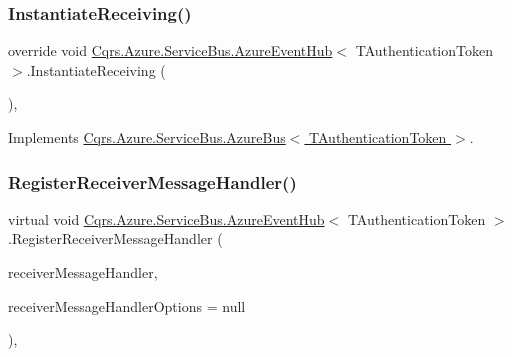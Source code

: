 \subsubsection{\texorpdfstring{Instantiate\+Receiving()}{InstantiateReceiving()}}
{\footnotesize\ttfamily override void \hyperlink{classCqrs_1_1Azure_1_1ServiceBus_1_1AzureEventHub}{Cqrs.\+Azure.\+Service\+Bus.\+Azure\+Event\+Hub}$<$ T\+Authentication\+Token $>$.Instantiate\+Receiving (\begin{DoxyParamCaption}{ }\end{DoxyParamCaption})\hspace{0.3cm}{\ttfamily [protected]}, {\ttfamily [virtual]}}



Implements \hyperlink{classCqrs_1_1Azure_1_1ServiceBus_1_1AzureBus_ac9f66dd531dcde49be72ba8f2cb28e9b}{Cqrs.\+Azure.\+Service\+Bus.\+Azure\+Bus$<$ T\+Authentication\+Token $>$}.

\mbox{\label{classCqrs_1_1Azure_1_1ServiceBus_1_1AzureEventHub_afbea0e107f3d4e8f8d4f2215ff2f7787}} 
\subsubsection{\texorpdfstring{Register\+Receiver\+Message\+Handler()}{RegisterReceiverMessageHandler()}}
{\footnotesize\ttfamily virtual void \hyperlink{classCqrs_1_1Azure_1_1ServiceBus_1_1AzureEventHub}{Cqrs.\+Azure.\+Service\+Bus.\+Azure\+Event\+Hub}$<$ T\+Authentication\+Token $>$.Register\+Receiver\+Message\+Handler (\begin{DoxyParamCaption}\item[{Action$<$ Partition\+Context, Event\+Data $>$}]{receiver\+Message\+Handler,  }\item[{Event\+Processor\+Options}]{receiver\+Message\+Handler\+Options = {\ttfamily null} }\end{DoxyParamCaption})\hspace{0.3cm}{\ttfamily [protected]}, {\ttfamily [virtual]}}

\mbox{\label{classCqrs_1_1Azure_1_1ServiceBus_1_1AzureEventHub_af823e573f3acc3fa9949969499309db1}} 
